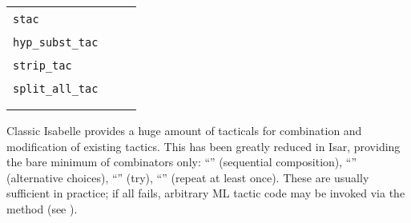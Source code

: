 \begin{isabellebody}
\begin{isamarkuptext}
  \medskip
  \begin{tabular}{lll}
    \verb|stac|~\isa{{\isaliteral{22}{\isachardoublequote}}a\ {\isadigit{1}}{\isaliteral{22}{\isachardoublequote}}} & & \isa{{\isaliteral{22}{\isachardoublequote}}subst\ a{\isaliteral{22}{\isachardoublequote}}} \\
    \verb|hyp_subst_tac|~\isa{{\isadigit{1}}} & & \isa{hypsubst} \\
    \verb|strip_tac|~\isa{{\isadigit{1}}} & \isa{{\isaliteral{22}{\isachardoublequote}}{\isaliteral{5C3C617070726F783E}{\isasymapprox}}{\isaliteral{22}{\isachardoublequote}}} & \isa{{\isaliteral{22}{\isachardoublequote}}intro\ strip{\isaliteral{22}{\isachardoublequote}}} \\
    \verb|split_all_tac|~\isa{{\isadigit{1}}} & & \isa{{\isaliteral{22}{\isachardoublequote}}simp\ {\isaliteral{28}{\isacharparenleft}}no{\isaliteral{5F}{\isacharunderscore}}asm{\isaliteral{5F}{\isacharunderscore}}simp{\isaliteral{29}{\isacharparenright}}\ only{\isaliteral{3A}{\isacharcolon}}\ split{\isaliteral{5F}{\isacharunderscore}}tupled{\isaliteral{5F}{\isacharunderscore}}all{\isaliteral{22}{\isachardoublequote}}} \\
      & \isa{{\isaliteral{22}{\isachardoublequote}}{\isaliteral{5C3C617070726F783E}{\isasymapprox}}{\isaliteral{22}{\isachardoublequote}}} & \isa{{\isaliteral{22}{\isachardoublequote}}simp\ only{\isaliteral{3A}{\isacharcolon}}\ split{\isaliteral{5F}{\isacharunderscore}}tupled{\isaliteral{5F}{\isacharunderscore}}all{\isaliteral{22}{\isachardoublequote}}} \\
      & \isa{{\isaliteral{22}{\isachardoublequote}}{\isaliteral{5C3C6C6C6573733E}{\isasymlless}}{\isaliteral{22}{\isachardoublequote}}} & \isa{{\isaliteral{22}{\isachardoublequote}}clarify{\isaliteral{22}{\isachardoublequote}}} \\
  \end{tabular}%
\end{isamarkuptext}%
\isamarkuptrue%
%
\isamarkuptrue%
%
\begin{isamarkuptext}%
Classic Isabelle provides a huge amount of tacticals for combination
  and modification of existing tactics.  This has been greatly reduced
  in Isar, providing the bare minimum of combinators only: ``'' (sequential composition), ``'' (alternative
  choices), ``'' (try), ``'' (repeat at least
  once).  These are usually sufficient in practice; if all fails,
  arbitrary ML tactic code may be invoked via the \hyperlink{method.tactic}{\mbox{}}
  method (see ).


\end{isamarkuptext}
\end{isabellebody}
